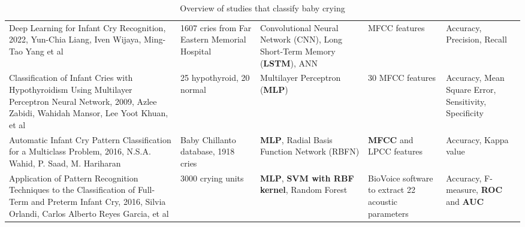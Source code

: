 \begin{table}[!ht]
\begin{tabularx}{\textwidth}{Xp{1.8cm}p{3.3cm}p{1.5cm}p{2.2cm}}
        Deep Learning for Infant Cry Recognition, 2022, Yun-Chia Liang, Iven Wijaya, Ming-Tao Yang et al \cite{Liang2022} & 1607 cries from Far Eastern Memorial Hospital & Convolutional Neural Network (CNN), Long Short-Term Memory (\textbf{LSTM}), ANN & MFCC features & Accuracy, Precision, Recall \\ %

        Classification of Infant Cries with Hypothyroidism Using Multilayer Perceptron Neural Network, 2009, Azlee Zabidi, Wahidah Mansor, Lee Yoot Khuan, et al \cite{zabidi2009classification} & 25 hypothyroid, 20 normal & Multilayer Perceptron (\textbf{MLP}) & 30 MFCC features & Accuracy, Mean Square Error, Sensitivity, Specificity \\ %

        Automatic Infant Cry Pattern Classification for a Multiclass Problem, 2016, N.S.A. Wahid, P. Saad, M. Hariharan \cite{Wahid2016} & Baby Chillanto database, 1918 cries & \textbf{MLP}, Radial Basis Function Network (RBFN) & \textbf{MFCC} and LPCC features & Accuracy, Kappa value \\ %

        Application of Pattern Recognition Techniques to the Classification of Full-Term and Preterm Infant Cry, 2016, Silvia Orlandi, Carlos Alberto Reyes Garcia, et al \cite{Orlandi2016} & 3000 crying units & \textbf{MLP}, \textbf{SVM with RBF kernel}, Random Forest & BioVoice software to extract 22 acoustic parameters & Accuracy, F-measure, \textbf{ROC} and \textbf{AUC} \\ %
 
    \bottomrule
    \end{tabularx}
    \caption{Overview of studies that classify baby crying}
    \label{table:paper_overview}
\end{table}
\FloatBarrier